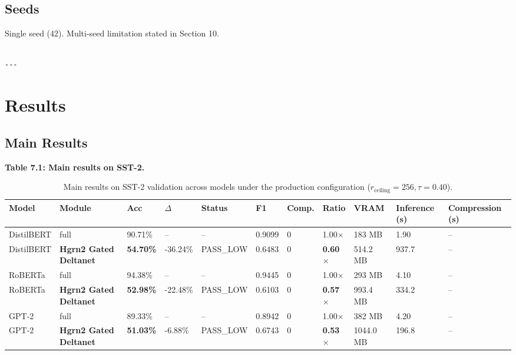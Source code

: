 \subsection{Seeds}

Single seed (42). Multi-seed limitation stated in Section 10.
\begin{lstlisting}

---
\end{lstlisting}

\section{Results}

\subsection{Main Results}

\textbf{Table 7.1: Main results on SST-2.}

\begin{table}[t]
\centering
\small
\begin{tabular}{lllllllllll}
\toprule
\textbf{Model} & \textbf{Module} & \textbf{Acc} & \textbf{$\Delta$} & \textbf{Status} & \textbf{F1} & \textbf{Comp.} & \textbf{Ratio} & \textbf{VRAM} & \textbf{Inference (s)} & \textbf{Compression (s)} \\
\midrule
DistilBERT & full & 90.71\% & -- & -- & 0.9099 & 0 & 1.00$\times$ & 183 MB & 1.90 & -- \\
DistilBERT & \textbf{Hgrn2 Gated Deltanet} & \textbf{54.70\%} & -36.24\% & PASS_LOW & 0.6483 & 0 & \textbf{0.60$\times$} & 514.2 MB & 937.7 & -- \\
RoBERTa & full & 94.38\% & -- & -- & 0.9445 & 0 & 1.00$\times$ & 293 MB & 4.10 & -- \\
RoBERTa & \textbf{Hgrn2 Gated Deltanet} & \textbf{52.98\%} & -22.48\% & PASS_LOW & 0.6103 & 0 & \textbf{0.57$\times$} & 993.4 MB & 334.2 & -- \\
GPT-2 & full & 89.33\% & -- & -- & 0.8942 & 0 & 1.00$\times$ & 382 MB & 4.20 & -- \\
GPT-2 & \textbf{Hgrn2 Gated Deltanet} & \textbf{51.03\%} & -6.88\% & PASS_LOW & 0.6743 & 0 & \textbf{0.53$\times$} & 1044.0 MB & 196.8 & -- \\
\bottomrule
\end{tabular}
\caption{Main results on SST-2 validation across models under the production configuration ($r_{\mathrm{ceiling}}=256, \tau=0.40$).}
\label{tab:main_sst2}
\end{table}


